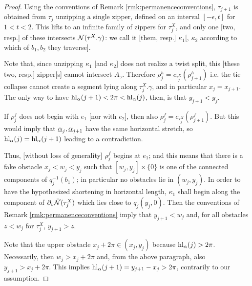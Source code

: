 \begin{proof}
Using the conventions of Remark \ref{rmk:permanenceconventions}, $\tau_{j+1}$ is obtained from $\tau_j$ unzipping a single zipper, defined on an interval $[-\epsilon,t]$ for $1<t<2$. This lifts to an infinite family of zippers for $\tau_j^X$, and only one [two, resp.] of these intersects $\bar{{\mathcal N}}(\tau^X.\gamma)$: we call it [them, resp.] $\kappa_1$[, $\kappa_2$ according to which of $b_1,b_2$ they traverse].

Note that, since unzipping $\kappa_1$ [and $\kappa_2$] does not realize a twist split, this [these two, resp.] zipper[s] cannot intersect $A_\gamma$. Therefore $\rho_j^h=c_{\tau_j^X}\left(\rho_{j+1}^h\right)$ i.e. the tie collapse cannot create a segment lying along $\tau_j^X.\gamma$, and in particular $x_j=x_{j+1}$. The only way to have $\mathrm{hl}_\alpha(j+1)<2\pi<\mathrm{hl}_\alpha(j)$, then, is that $y_{j+1}<y_j$.

If $\rho_j^f$ does not begin with $e_1$ [nor with $e_2$], then also $\rho_j^f=c_{\tau_j^X}\left(\rho_{j+1}^f\right)$. But this would imply that ${\underline{\alpha}}_j,{\underline{\alpha}}_{j+1}$ have the same horizontal stretch, so $\mathrm{hl}_\alpha(j)=\mathrm{hl}_\alpha(j+1)$ leading to a contradiction.

Thus, [without loss of generality] $\rho_j^f$ begins at $e_1$; and this means that there is a fake obstacle $x_j<w_j<y_j$ such that $[w_j,y_j]\times\{0\}$ is one of the connected components of $q_j^{-1}(b_1)$; in particular no obstacles lie in $(w_j,y_j)$. In order to have the hypothesized shortening in horizontal length, $\kappa_1$ shall begin along the component of $\partial_v\bar{{\mathcal N}}(\tau_j^X)$ which lies close to $q_j(y_j,0)$. Then the conventions of Remark \ref{rmk:permanenceconventions} imply that $y_{j+1}<w_j$ and, for all obstacles $z<w_j$ for $\tau_j^X$, $y_{j+1}>z$. 

Note that the upper obstacle $x_j+2\pi\in (x_j,y_j)$ because $\mathrm{hl}_\alpha(j)>2\pi$. Necessarily, then $w_j>x_j+2\pi$ and, from the above paragraph, also $y_{j+1}>x_j+2\pi$. This implies $\mathrm{hl}_{\alpha}(j+1)=y_{j+1}-x_j>2\pi$, contrarily to our assumption.
\end{proof}

